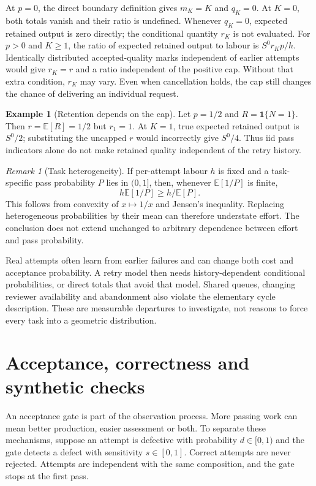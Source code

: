 \documentclass[11pt,a4paper]{amsart}
\theoremstyle{definition}
\newtheorem{example}[proposition]{Example}
\theoremstyle{remark}
\newtheorem{remark}[proposition]{Remark}
\newcommand{\E}{\mathbb E}
\newcommand{\ind}{\mathbf 1}
\begin{document}
At $p=0$, the direct boundary definition gives $m_K=K$ and $q_K=0$. At $K=0$, both totals vanish and their ratio is undefined. Whenever $q_K=0$, expected retained output is zero directly; the conditional quantity $r_K$ is not evaluated. For $p>0$ and $K\geq1$, the ratio of expected retained output to labour is $S^0r_Kp/h$. Identically distributed accepted-quality marks independent of earlier attempts would give $r_K=r$ and a ratio independent of the positive cap. Without that extra condition, $r_K$ may vary. Even when cancellation holds, the cap still changes the chance of delivering an individual request.
\begin{example}[Retention depends on the cap]\label{ex:capped-retention}
Let $p=1/2$ and $R=\ind\{N=1\}$. Then $r=\E[R]=1/2$ but $r_1=1$. At $K=1$, true expected retained output is $S^0/2$; substituting the uncapped $r$ would incorrectly give $S^0/4$. Thus iid pass indicators alone do not make retained quality independent of the retry history.
\end{example}

\begin{remark}[Task heterogeneity]
\label{rem:heterogeneity}
If per-attempt labour $h$ is fixed and a task-specific pass probability $P$ lies in $(0,1]$, then, whenever $\E[1/P]$ is finite,
\begin{equation}
\label{eq:heterogeneity}
 h\E[1/P]\geq h/\E[P].
\end{equation}
This follows from convexity of $x\mapsto1/x$ and Jensen's inequality. Replacing heterogeneous probabilities by their mean can therefore understate effort. The conclusion does not extend unchanged to arbitrary dependence between effort and pass probability.
\end{remark}

Real attempts often learn from earlier failures and can change both cost and acceptance probability. A retry model then needs history-dependent conditional probabilities, or direct totals that avoid that model. Shared queues, changing reviewer availability and abandonment also violate the elementary cycle description. These are measurable departures to investigate, not reasons to force every task into a geometric distribution.

\section{Acceptance, correctness and synthetic checks}
\label{sec:detection}

An acceptance gate is part of the observation process. More passing work can mean better production, easier assessment or both. To separate these mechanisms, suppose an attempt is defective with probability $d\in[0,1)$ and the gate detects a defect with sensitivity $s\in[0,1]$. Correct attempts are never rejected. Attempts are independent with the same composition, and the gate stops at the first pass.
\end{document}
